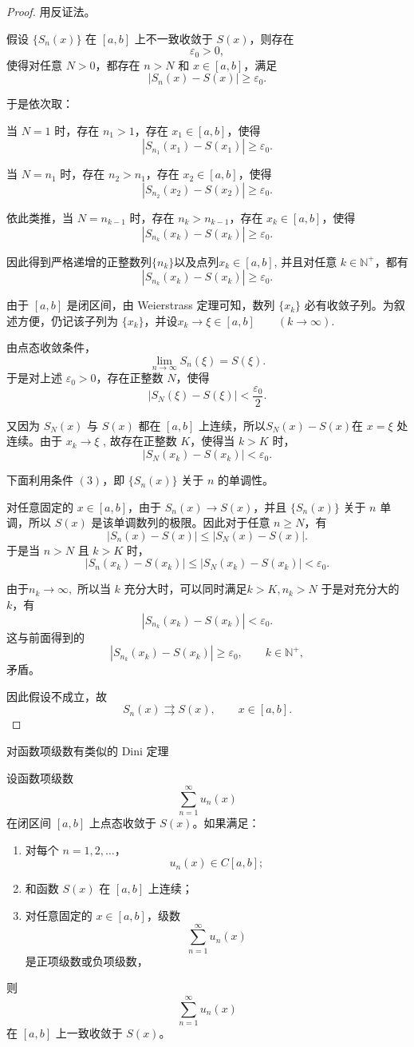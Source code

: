 \begin{proof}
	用反证法。
	
	假设 $\{S_n(x)\}$ 在 $[a,b]$ 上不一致收敛于 $S(x)$，则存在
	\[
	\varepsilon_0>0,
	\]
	使得对任意 $N>0$，都存在 $n>N$ 和 $x\in[a,b]$，满足
	\[
	|S_n(x)-S(x)|\geq \varepsilon_0.
	\]
	
	于是依次取：
	
	当 $N=1$ 时，存在 $n_1>1$，存在 $x_1\in[a,b]$，使得
	\[
	|S_{n_1}(x_1)-S(x_1)|\geq \varepsilon_0.
	\]
	
	当 $N=n_1$ 时，存在 $n_2>n_1$，存在 $x_2\in[a,b]$，使得
	\[
	|S_{n_2}(x_2)-S(x_2)|\geq \varepsilon_0.
	\]
	
	依此类推，当 $N=n_{k-1}$ 时，存在 $n_k>n_{k-1}$，存在 $x_k\in[a,b]$，使得
	\[
	|S_{n_k}(x_k)-S(x_k)|\geq \varepsilon_0.
	\]
	
	因此得到严格递增的正整数列$\{n_k\}$以及点列$ x_k\in[a,b]$,
	并且对任意 $k\in\mathbb N^+$，都有
	\[
	|S_{n_k}(x_k)-S(x_k)|\geq \varepsilon_0.
	\]
	
	由于 $[a,b]$ 是闭区间，由 Weierstrass 定理可知，数列 $\{x_k\}$ 必有收敛子列。为叙述方便，仍记该子列为 $\{x_k\}$，并设$x_k\to \xi\in[a,b]\qquad (k\to\infty). $

	由点态收敛条件，
	\[
	\lim_{n\to\infty}S_n(\xi)=S(\xi).
	\]
	于是对上述 $\varepsilon_0>0$，存在正整数 $N$，使得
	\[
	|S_N(\xi)-S(\xi)|<\frac{\varepsilon_0}{2}.
	\]
	
	又因为 $S_N(x)$ 与 $S(x)$ 都在 $[a,b]$ 上连续，所以$S_N(x)-S(x) $在 $x=\xi$ 处连续。由于
	$x_k\to \xi $
	,	故存在正整数 $K$，使得当 $k>K$ 时，
	\[
	|S_N(x_k)-S(x_k)|<\varepsilon_0.
	\]
	
	下面利用条件 $(3)$，即 $\{S_n(x)\}$ 关于 $n$ 的单调性。
	
	对任意固定的 $x\in[a,b]$，由于 $S_n(x)\to S(x)$，并且 $\{S_n(x)\}$ 关于 $n$ 单调，所以 $S(x)$ 是该单调数列的极限。因此对于任意 $n\geq N$，有
	\[
	|S_n(x)-S(x)|
	\leq
	|S_N(x)-S(x)|.
	\]
	于是当 $n>N$ 且 $k>K$ 时，
	\[
	|S_n(x_k)-S(x_k)|
	\leq
	|S_N(x_k)-S(x_k)|
	<
	\varepsilon_0.
	\]
	
	由于$ n_k\to\infty,$
	所以当 $k$ 充分大时，可以同时满足$ k>K, n_k>N$
	于是对充分大的 $k$，有
	\[
	|S_{n_k}(x_k)-S(x_k)|<\varepsilon_0.
	\]
	这与前面得到的
	\[
	|S_{n_k}(x_k)-S(x_k)|\geq \varepsilon_0,
	\qquad k\in\mathbb N^+,
	\]
	矛盾。
	
	因此假设不成立，故
	\[
	S_n(x)\rightrightarrows S(x),\qquad x\in[a,b].
	\]
\end{proof}
对函数项级数有类似的 Dini 定理
\begin{proposition}
	设函数项级数
	\[
	\sum_{n=1}^{\infty}u_n(x)
	\]
	在闭区间 $[a,b]$ 上点态收敛于 $S(x)$。如果满足：
	
	\begin{enumerate}
		\item 对每个 $n=1,2,\dots$，
		\[
		u_n(x)\in C[a,b];
		\]
		\item 和函数 $S(x)$ 在 $[a,b]$ 上连续；
		\item 对任意固定的 $x\in[a,b]$，级数
		\[
		\sum_{n=1}^{\infty}u_n(x)
		\]
		是正项级数或负项级数，
	\end{enumerate}
	则
	\[
	\sum_{n=1}^{\infty}u_n(x)
	\]
	在 $[a,b]$ 上一致收敛于 $S(x)$。
\end{proposition}



